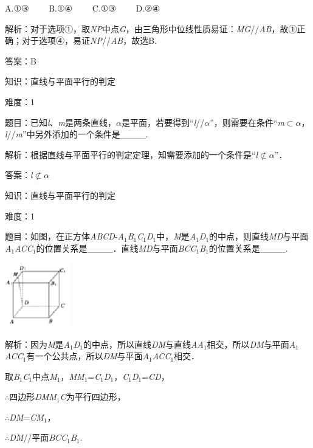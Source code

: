 \documentclass{article} %
\begin{document}
A.①③　　 B.①④　　 C.①③　　 D.②④

解析：对于选项①，取\textit{NP}中点\textit{G}，由三角形中位线性质易证：\textit{MG}//\textit{AB}，故①正确；对于选项④，易证\textit{NP}//\textit{AB}，故选B.

答案：B

知识：直线与平面平行的判定

难度：1

题目：已知\textit{l}、\textit{m}是两条直线，\textit{$\alpha$}是平面，若要得到``\textit{l}//\textit{$\alpha$}''，则需要在条件``\textit{m}$\mathrm{\subset }$\textit{$\alpha$}，\textit{l}//\textit{m}''中另外添加的一个条件是\_\_\_\_.

解析：根据直线与平面平行的判定定理，知需要添加的一个条件是``\textit{l}$\mathrm{\nsubset}$\textit{$\alpha$}''．

答案：\textit{l}$\mathrm{\nsubset}$\textit{$\alpha$}

知识：直线与平面平行的判定

难度：1

题目：如图，在正方体\textit{ABCD}-\textit{A}${}_{1}$\textit{B}${}_{1}$\textit{C}${}_{1}$\textit{D}${}_{1}$中，\textit{M}是\textit{A}${}_{1}$\textit{D}${}_{1}$的中点，则直线\textit{MD}与平面\textit{A}${}_{1}$\textit{ACC}${}_{1}$的位置关系是\_\_\_\_．直线\textit{MD}与平面\textit{BCC}${}_{1}$\textit{B}${}_{1}$的位置关系是\_\_\_\_.

\includegraphics*[width=1.12in, height=1.10in, keepaspectratio=false]{image132}

解析：因为\textit{M}是\textit{A}${}_{1}$\textit{D}${}_{1}$的中点，所以直线\textit{DM}与直线\textit{AA}${}_{1}$相交，所以\textit{DM}与平面\textit{A}${}_{1}$\textit{ACC}${}_{1}$有一个公共点，所以\textit{DM}与平面\textit{A}${}_{1}$\textit{ACC}${}_{1}$相交．

取\textit{B}${}_{1}$\textit{C}${}_{1}$中点\textit{M}${}_{1}$，\textit{MM}${}_{1}$=\textit{C}${}_{1}$\textit{D}${}_{1}$，\textit{C}${}_{1}$\textit{D}${}_{1}$=\textit{CD}，

$\mathrm{\therefore}$四边形\textit{DMM}${}_{1}$\textit{C}为平行四边形，

$\mathrm{\therefore}$\textit{DM}=\textit{CM}${}_{1}$，

$\mathrm{\therefore}$\textit{DM}//平面\textit{BCC}${}_{1}$\textit{B}${}_{1}$.
\end{document}
